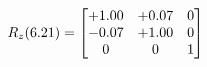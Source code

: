 \documentclass[preview]{standalone}
\begin{document}
\begin{align*}
\special{dvisvgm:raw <g id='unique000'>}R_{z}(6.21) = \begin{bmatrix}+1.00 & +0.07 & 0 \\-0.07 & +1.00 & 0 \\0 & 0 & 1\end{bmatrix}\special{dvisvgm:raw </g>}
\end{align*}
\end{document}
